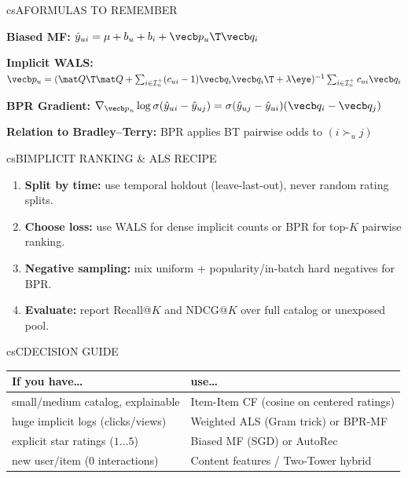 \documentclass[../../../../master.tex]{subfiles}
\begin{document}
\begin{cscolumns}
\begin{cscard}{csA}{FORMULAS TO REMEMBER}
  \begin{csbul}
    \item \textbf{Biased MF:} $\hat y_{ui}=\mu+b_u+b_i+\vecb p_u\T\vecb q_i$
    \item \textbf{Implicit WALS:} $\vecb p_u = (\mat Q\T\mat Q + \sum_{i\in\mathcal I_u^+}(c_{ui}-1)\vecb q_i\vecb q_i\T + \lambda\eye)^{-1}\sum_{i\in\mathcal I_u^+} c_{ui}\vecb q_i$
    \item \textbf{BPR Gradient:} $\nabla_{\vecb p_u}\log\sigma(\hat y_{ui}-\hat y_{uj}) = \sigma(\hat y_{uj}-\hat y_{ui})(\vecb q_i-\vecb q_j)$
    \item \textbf{Relation to Bradley--Terry:} BPR applies BT pairwise odds to $(i \succ_u j)$
  \end{csbul}
\end{cscard}

\begin{cscard}{csB}{IMPLICIT RANKING \& ALS RECIPE}
  \begin{enumerate}[leftmargin=1.2em, itemsep=1pt, topsep=1pt, parsep=0pt]
    \item \textbf{Split by time:} use temporal holdout (leave-last-out), never random rating splits.
    \item \textbf{Choose loss:} use WALS for dense implicit counts or BPR for top-$K$ pairwise ranking.
    \item \textbf{Negative sampling:} mix uniform + popularity/in-batch hard negatives for BPR.
    \item \textbf{Evaluate:} report Recall@$K$ and NDCG@$K$ over full catalog or unexposed pool.
  \end{enumerate}
\end{cscard}
\columnbreak

\begin{cscard}{csC}{DECISION GUIDE}
  \renewcommand{\arraystretch}{1.18}\small
  \begin{tabular}{@{}>{\raggedright\arraybackslash}p{3.1cm}>{\raggedright\arraybackslash}p{4.6cm}@{}}
    \textbf{If you have\ldots} & \textbf{use\ldots}\\ \hline
    small/medium catalog, explainable & Item-Item CF (cosine on centered ratings)\\
    huge implicit logs (clicks/views) & Weighted ALS (Gram trick) or BPR-MF\\
    explicit star ratings ($1\dots 5$) & Biased MF (SGD) or AutoRec\\
    new user/item (0 interactions) & Content features / Two-Tower hybrid\\
  \end{tabular}
\end{cscard}


\end{cscolumns}
\end{document}
